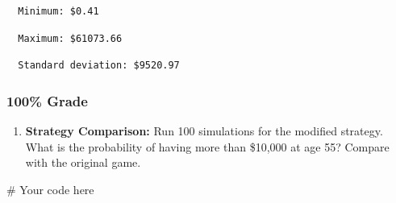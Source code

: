 \documentclass[
  letterpaper,
  DIV=11,
  numbers=noendperiod]{scrartcl}
\newenvironment{Shaded}{\begin{snugshade}}{\end{snugshade}}
\newcommand{\AttributeTok}[1]{\textcolor[rgb]{0.40,0.45,0.13}{#1}}
\newcommand{\CommentTok}[1]{\textcolor[rgb]{0.37,0.37,0.37}{#1}}
\newcommand{\DecValTok}[1]{\textcolor[rgb]{0.68,0.00,0.00}{#1}}
\newcommand{\FunctionTok}[1]{\textcolor[rgb]{0.28,0.35,0.67}{#1}}
\newcommand{\NormalTok}[1]{\textcolor[rgb]{0.00,0.23,0.31}{#1}}
\newcommand{\SpecialCharTok}[1]{\textcolor[rgb]{0.37,0.37,0.37}{#1}}
\newcommand{\StringTok}[1]{\textcolor[rgb]{0.13,0.47,0.30}{#1}}
\providecommand{\tightlist}{%
  \setlength{\itemsep}{0pt}\setlength{\parskip}{0pt}}
\begin{document}
\begin{verbatim}
  Minimum: $0.41
\end{verbatim}

\begin{Shaded}
\end{Shaded}

\begin{verbatim}
  Maximum: $61073.66
\end{verbatim}

\begin{Shaded}
\end{Shaded}

\begin{verbatim}
  Standard deviation: $9520.97
\end{verbatim}

\subsubsection{100\% Grade}\label{grade-3}

\begin{enumerate}
\def\labelenumi{\arabic{enumi}.}
\setcounter{enumi}{5}
\tightlist
\item
  \textbf{Strategy Comparison:} Run 100 simulations for the modified
  strategy. What is the probability of having more than \$10,000 at age
  55? Compare with the original game.
\end{enumerate}

\begin{Shaded}
\begin{Highlighting}[]
\CommentTok{\# Your code here}
\end{Highlighting}
\end{Shaded}
\end{document}
